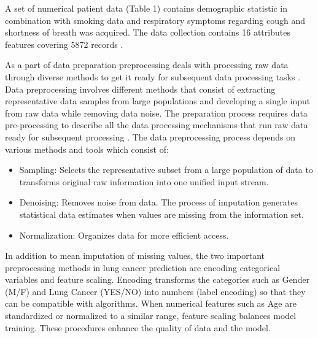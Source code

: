 \documentclass[runningheads]{llncs}
\begin{document}
A set of numerical patient data (Table 1) contains demographic statistic in combination with smoking data and respiratory symptoms regarding cough and shortness of breath was acquired. The data collection contains 16 attributes features covering  5872 records \cite{kanakaraddi2024}.


As a part of data preparation preprocessing deals with processing raw data through diverse methods to get it ready for subsequent data processing tasks \cite{lungcancerbook}. Data preprocessing involves different methods that consist of extracting representative data samples from large populations and developing a single input from raw data while removing data noise.  The preparation process requires data pre-processing to describe all the data processing mechanisms that run raw data ready for subsequent processing \cite{lungcancerbook,wu2021}. The data preprocessing process depends on various methods and tools which consist of:
\begin{itemize}
    \item Sampling: Selects the representative subset from a large population of data to transforms original raw information into one unified input stream.
    \item Denoising: Removes noise from data. The process of imputation generates statistical data estimates when values are missing from the information set.
    \item Normalization: Organizes data for more efficient access.
\end{itemize}

In addition to mean imputation of missing values, the two important preprocessing methods in lung cancer prediction are encoding categorical variables and feature scaling. Encoding transforms the categories such as Gender (M/F) and Lung Cancer (YES/NO) into numbers (label encoding) so that they can be compatible with algorithms. When numerical features such as Age are standardized or normalized to a similar range, feature scaling balances model training. These procedures enhance the quality of data and the model.
\end{document}
